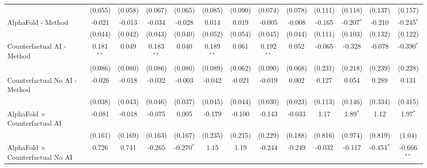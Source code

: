 \begin{tabular}{lcccccccccccc}
                                                              & (0.055)      & (0.058)      & (0.067)      & (0.065)        & (0.085)      & (0.090) & (0.074)      & (0.078)     & (0.111) & (0.118)      & (0.137)      & (0.157)\\   
   AlphaFold - Method                                         & -0.021       & -0.013       & -0.034       & -0.028         & 0.014        & 0.019   & -0.005       & -0.008      & -0.165  & -0.207$^{*}$ & -0.210       & -0.245$^{*}$\\   
                                                              & (0.044)      & (0.042)      & (0.043)      & (0.040)        & (0.052)      & (0.054) & (0.045)      & (0.044)     & (0.111) & (0.103)      & (0.132)      & (0.122)\\   
   Counterfactual AI - Method                                 & 0.181$^{**}$ & 0.049        & 0.183$^{**}$ & 0.040          & 0.189$^{**}$ & 0.061   & 0.192$^{**}$ & 0.052       & -0.065  & -0.328       & -0.078       & -0.390$^{*}$\\   
                                                              & (0.086)      & (0.080)      & (0.086)      & (0.080)        & (0.089)      & (0.062) & (0.090)      & (0.068)     & (0.231) & (0.218)      & (0.239)      & (0.228)\\   
   Counterfactual No AI - Method                              & -0.026       & -0.018       & -0.032       & -0.003         & -0.042       & -0.021  & -0.019       & 0.002       & 0.127   & 0.054        & 0.289        & 0.131\\   
                                                              & (0.038)      & (0.043)      & (0.046)      & (0.037)        & (0.045)      & (0.044) & (0.030)      & (0.023)     & (0.113) & (0.146)      & (0.334)      & (0.415)\\   
   AlphaFold $\times$ Counterfactual AI                       & -0.081       & -0.018       & -0.075       & 0.005          & -0.179       & -0.100  & -0.143       & -0.033      & 1.17    & 1.89$^{*}$   & 1.12         & 1.97$^{*}$\\   
                                                              & (0.161)      & (0.169)      & (0.163)      & (0.167)        & (0.235)      & (0.215) & (0.229)      & (0.188)     & (0.816) & (0.974)      & (0.819)      & (1.04)\\   
   AlphaFold $\times$ Counterfactual No AI                    & 0.726        & 0.741        & -0.265       & -0.270$^{*}$   & 1.15         & 1.19    & -0.244       & -0.249      & -0.032  & -0.117       & -0.454$^{*}$ & -0.666$^{**}$\\   

\end{tabular}
